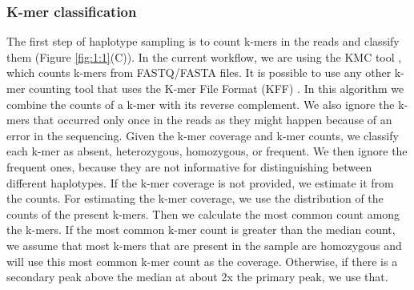 \documentclass[11pt]{ucthesis}
\begin{document}
\subsubsection{K-mer classification}
The first step of haplotype sampling is to count k-mers in the reads and classify them (Figure \ref{fig:1:1}(C)). In the current workflow, we are using the KMC tool \cite{kokot2017kmc}, which counts k-mers from FASTQ/FASTA files. It is possible to use any other k-mer counting tool that uses the K-mer File Format (KFF) \cite{dufresne2022k}. In this algorithm we combine the counts of a k-mer with its reverse complement. We also ignore the k-mers that occurred only once in the reads as they might happen because of an error in the sequencing. Given the k-mer coverage and k-mer counts, we classify each k-mer as absent, heterozygous, homozygous, or frequent. We then ignore the frequent ones, because they are not informative for distinguishing between different haplotypes. If the k-mer coverage is not provided, we estimate it from the counts. For estimating the k-mer coverage, we use the distribution of the counts of the  present k-mers. Then we calculate the most common count among the k-mers. If the most common k-mer count is greater than the median count, we assume that most k-mers that are present in the sample are homozygous and will use this most common k-mer count as the coverage. Otherwise, if there is a secondary peak above the median at about 2x the primary peak, we use that. 
\end{document}
